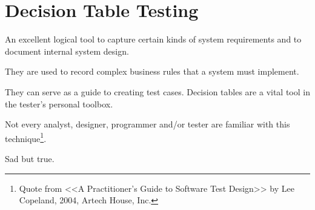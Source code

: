 \section{Decision Table Testing}
\label{sec:Decision Table Testing}

An excellent logical tool to capture certain kinds of system requirements and to document internal system design. 

They are used to record complex business rules that a system must implement. 

They can serve as a guide to creating test cases. Decision tables are a vital tool in the tester's personal toolbox.

Not every analyst, designer, programmer and/or tester are familiar with this technique\footnote{Quote from <<A Practitioner's Guide to Software Test Design>> by Lee Copeland, 2004, Artech House, Inc.}.

Sad but true.